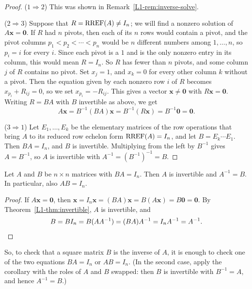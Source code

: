\begin{proof}
    ($1 \Rightarrow 2$) This was shown in Remark~\ref{L1-rem:inverse-solve}.

    ($2 \Rightarrow 3$) Suppose that $R = \operatorname{RREF}(A) \neq I_n$; we will find a nonzero solution of $A\mathbf{x} = \mathbf{0}$. If $R$ had $n$ pivots, then each of its $n$ rows would contain a pivot, and the pivot columns $p_1 < p_2 < \cdots < p_n$ would be $n$ different numbers among $1, \ldots, n$, so $p_i = i$ for every $i$. Since each pivot is a $1$ and is the only nonzero entry in its column, this would mean $R = I_n$. So $R$ has fewer than $n$ pivots, and some column $j$ of $R$ contains no pivot. Set $x_j = 1$, and $x_k = 0$ for every other column $k$ without a pivot. Then the equation given by each nonzero row $i$ of $R$ becomes $x_{p_i} + R_{ij} = 0$, so we set $x_{p_i} = -R_{ij}$. This gives a vector $\mathbf{x} \neq \mathbf{0}$ with $R\mathbf{x} = \mathbf{0}$. Writing $R = BA$ with $B$ invertible as above, we get
    \[A\mathbf{x} = B^{-1}(BA)\mathbf{x} = B^{-1}(R\mathbf{x}) = B^{-1}\mathbf{0} = \mathbf{0}.\]

    ($3 \Rightarrow 1$) Let $E_1, \ldots, E_k$ be the elementary matrices of the row operations that bring $A$ to its reduced row echelon form $\operatorname{RREF}(A) = I_n$, and let $B = E_k \cdots E_1$. Then $BA = I_n$, and $B$ is invertible. Multiplying from the left by $B^{-1}$ gives $A = B^{-1}$, so $A$ is invertible with $A^{-1} = (B^{-1})^{-1} = B$.
\end{proof}

\begin{corollary}\label{L1-cor:one-sided}
    Let $A$ and $B$ be $n \times n$ matrices with $BA = I_n$. Then $A$ is invertible and $A^{-1} = B$. In particular, also $AB = I_n$.
\end{corollary}

\begin{proof}
    If $A\mathbf{x} = \mathbf{0}$, then $\mathbf{x} = I_n \mathbf{x} = (BA)\mathbf{x} = B(A\mathbf{x}) = B\mathbf{0} = \mathbf{0}$. By Theorem~\ref{L1-thm:invertible}, $A$ is invertible, and
    \[B = B I_n = B(AA^{-1}) = (BA)A^{-1} = I_n A^{-1} = A^{-1}. \qedhere\]
\end{proof}

So, to check that a square matrix $B$ is the inverse of $A$, it is enough to check one of the two equations $BA = I_n$ or $AB = I_n$. (In the second case, apply the corollary with the roles of $A$ and $B$ swapped: then $B$ is invertible with $B^{-1} = A$, and hence $A^{-1} = B$.)

